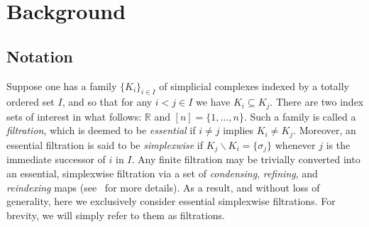\documentclass{article} %
\begin{document}
\section{Background}\label{sec:background} 
\subsection{Notation}\label{sec:notation} 

Suppose one has a family $\{K_i\}_{i\in I}$ of simplicial complexes indexed by a totally ordered   set $I$, and so that for any $i< j \in I$ we have $K_i \subseteq K_j$. There are two index sets of interest in what follows: $\mathbb{R}$ and $[n] = \{ 1, \dots, n\}$. 
Such a family is called a \emph{filtration},
which is deemed to be \emph{essential} if $i \neq j$ implies $K_i \neq K_j$.
Moreover, an essential filtration is said to be  \emph{simplexwise} if $K_j \smallsetminus K_i = \{\sigma_j\}$ 
whenever $j$ is the immediate successor of $i$ in $I$.
Any finite filtration may be trivially converted into an essential, simplexwise filtration via a set of \emph{condensing}, \emph{refining}, and \emph{reindexing} maps (see~\cite{bauer2021ripser} for more details). 
As a result, and without loss of generality, here we exclusively consider essential simplexwise filtrations. For brevity, we will simply refer to them as filtrations. 
\end{document}
